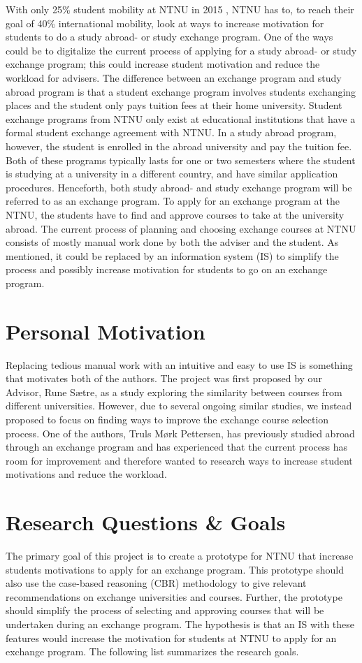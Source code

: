 With only 25\% student mobility at NTNU in 2015 \cite{studentutveksling_andel}, NTNU has to, to reach their goal of 40\% international mobility, look at ways to increase motivation for students to do a study abroad- or study exchange program. One of the ways could be to digitalize the current process of applying for a study abroad- or study exchange program; this could increase student motivation and reduce the workload for advisers. The difference between an exchange program and study abroad program is that a student exchange program involves students exchanging places and the student only pays tuition fees at their home university. Student exchange programs from NTNU only exist at educational institutions that have a formal student exchange agreement with NTNU. In a study abroad program, however, the student is enrolled in the abroad university and pay the tuition fee. Both of these programs typically lasts for one or two semesters where the student is studying at a university in a different country, and have similar application procedures. Henceforth, both study abroad- and study exchange program will be referred to as an exchange program. To apply for an exchange program at the NTNU, the students have to find and approve courses to take at the university abroad. The current process of planning and choosing exchange courses at NTNU consists of mostly manual work done by both the adviser and the student. As mentioned, it could be replaced by an information system (IS) to simplify the process and possibly increase motivation for students to go on an exchange program.

\section{Personal Motivation}
Replacing tedious manual work with an intuitive and easy to use IS is something that motivates both of the authors. The project was first proposed by our Advisor, Rune Sætre, as a study exploring the similarity between courses from different universities. However, due to several ongoing similar studies, we instead proposed to focus on finding ways to improve the exchange course selection process. One of the authors, Truls Mørk Pettersen, has previously studied abroad through an exchange program and has experienced that the current process has room for improvement and therefore wanted to research ways to increase student motivations and reduce the workload.

\section{Research Questions \& Goals}\label{RQ}
The primary goal of this project is to create a prototype for NTNU that increase students motivations to apply for an exchange program. This prototype should also use the case-based reasoning (CBR) methodology to give relevant recommendations on exchange universities and courses. Further, the prototype should simplify the process of selecting and approving courses that will be undertaken during an exchange program. The hypothesis is that an IS with these features would increase the motivation for students at NTNU to apply for an exchange program. The following list summarizes the research goals.

